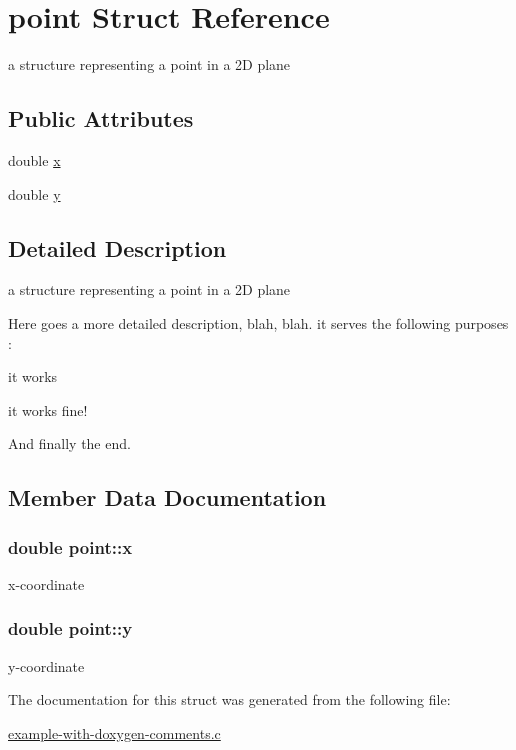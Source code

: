 \hypertarget{structpoint}{}\section{point Struct Reference}
\label{structpoint}


a structure representing a point in a 2D plane  


\subsection*{Public Attributes}
\begin{DoxyCompactItemize}
\item 
double \hyperlink{structpoint_a9c6b34deaf4900ad4193c17935fd384a}{x}
\item 
double \hyperlink{structpoint_a613f8f0d7352731638b0094e1b958b87}{y}
\end{DoxyCompactItemize}


\subsection{Detailed Description}
a structure representing a point in a 2D plane 

Here goes a more detailed description, blah, blah. it serves the following purposes \+:


\begin{DoxyItemize}
\item it works 
\item it works fine! 
\end{DoxyItemize}

And finally the end. 

\subsection{Member Data Documentation}
\subsubsection[{\texorpdfstring{x}{x}}]{\setlength{\rightskip}{0pt plus 5cm}double point\+::x}\hypertarget{structpoint_a9c6b34deaf4900ad4193c17935fd384a}{}\label{structpoint_a9c6b34deaf4900ad4193c17935fd384a}
x-\/coordinate 
\subsubsection[{\texorpdfstring{y}{y}}]{\setlength{\rightskip}{0pt plus 5cm}double point\+::y}\hypertarget{structpoint_a613f8f0d7352731638b0094e1b958b87}{}\label{structpoint_a613f8f0d7352731638b0094e1b958b87}
y-\/coordinate 

The documentation for this struct was generated from the following file\+:\begin{DoxyCompactItemize}
\item 
\hyperlink{example-with-doxygen-comments_8c}{example-\/with-\/doxygen-\/comments.\+c}\end{DoxyCompactItemize}
